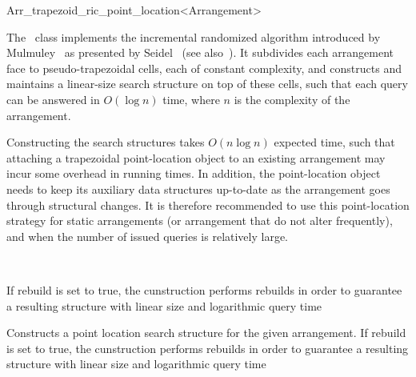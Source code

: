
\ccRefPageBegin

\begin{ccRefClass}{Arr_trapezoid_ric_point_location<Arrangement>}
\label{arr_ref:trap_pl}

\ccDefinition

The \ccRefName\ class implements the incremental randomized algorithm
introduced by Mulmuley~\cite{m-fppa-90} as presented by
Seidel~\cite{s-sfira-91} (see also~\cite[Chapter~6]{bkos-cgaa-00}).
It subdivides each arrangement face to pseudo-trapezoidal cells, each
of constant complexity, and constructs and maintains a linear-size search
structure on top of these cells, such that each query can be answered
in $O(\log n)$ time, where $n$ is the complexity of the arrangement.

Constructing the search structures takes $O(n \log n)$ expected time, such that
attaching a trapezoidal point-location object to an existing arrangement
may incur some overhead in running times. In addition, the point-location
object needs to keep its auxiliary data structures up-to-date as the
arrangement goes through structural changes. It is therefore recommended
to use this point-location strategy for static arrangements (or arrangement
that do not alter frequently), and when the number of issued queries
is relatively large.


\ccIsModel
   \\

\ccCreation
{}

    {If rebuild is set to true, the cunstruction performs rebuilds in order to guarantee a resulting structure with linear size and logarithmic query time}

    {Constructs a point location search structure for the given arrangement. If rebuild is set to true, the cunstruction performs rebuilds in order to guarantee a resulting structure with linear size and logarithmic query time}


\end{ccRefClass}

